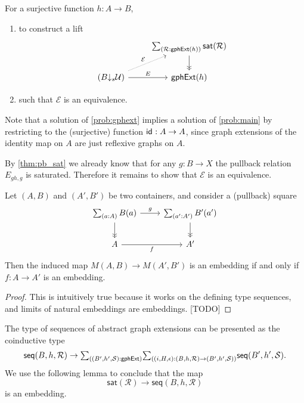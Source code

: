 \begin{prob}\label{prob:gphext}
For a surjective function $h:A\to B$,
\begin{enumerate}
\item to construct a lift
\begin{equation*}
\begin{tikzcd}
& \sm{\mathcal{R}:\mathsf{gphExt}(h)}\mathsf{sat}(\mathcal{R}) \arrow[d,->>] \\
(B{\downarrow_s}\UU) \arrow[r,"E"] \arrow[ur,densely dotted,"\mathcal{E}"] & \mathsf{gphExt}(h)
\end{tikzcd}
\end{equation*}
\item such that $\mathcal{E}$ is an equivalence.
\end{enumerate}
\end{prob}

Note that a solution of \autoref{prob:gphext} implies a solution of \autoref{prob:main} by restricting to the (surjective) function $\mathsf{id}_{}:A\to A$, since graph extensions of the identity map on $A$ are just reflexive graphs on $A$.

By \autoref{thm:pb_sat} we already know that for any $g:B\to X$ the pullback relation $E_{gh,g}$ is saturated. Therefore it remains to show that $\mathcal{E}$ is an equivalence.

\begin{lem}
Let $(A,B)$ and $(A',B')$ be two containers, and consider a (pullback) square
\begin{equation*}
\begin{tikzcd}
\sm{a:A}B(a) \arrow[d,->>] \arrow[r,"g"] & \sm{a':A'}B'(a') \arrow[d,->>] \\
A \arrow[r,swap,"f"] & A'
\end{tikzcd}
\end{equation*}
Then the induced map $M(A,B)\to M(A',B')$ is an embedding if and only if $f:A\to A'$ is an embedding. 
\end{lem}

\begin{proof}
This is intuitively true because it works on the defining type sequences, and limits of natural embeddings are embeddings. [TODO]
\end{proof}

The type of sequences of abstract graph extensions can be presented as the coinductive type
\begin{equation*}
\mathsf{seq}(B,h,\mathcal{R})\to\sm{(B',h',\mathcal{S}):\mathsf{gphExt}}{(i,H,\epsilon):(B,h,\mathcal{R})\to(B',h',\mathcal{S})}\mathsf{seq}(B',h',\mathcal{S}).
\end{equation*}
We use the following lemma to conclude that the map
\begin{equation*}
\mathsf{sat}(\mathcal{R})\to\mathsf{seq}(B,h,\mathcal{R})
\end{equation*}
is an embedding.

